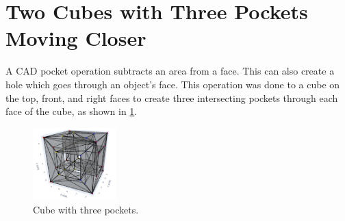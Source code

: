 \documentclass[ma]{uncgdissertationexp}
\theoremstyle{plain}
\theoremstyle{definition}
\theoremstyle{remark}
\begin{document}
\section{Two Cubes with Three Pockets Moving Closer}
\begin{multicols}{2}
A CAD pocket operation subtracts an area from a face. This can also create a hole which goes through an object's face. This operation was done to a cube on the top, front, and right faces to create three intersecting pockets through each face of the cube, as shown in \ref{fig:three_pocket_example}.
\columnbreak
\begin{figure}[H]
\begin{center}
	\includegraphics[height=1.1in]{one cube three pockets each.png}
    \caption{Cube with three pockets.}
\label{fig:three_pocket_example}
\end{center}
\end{figure}
\end{multicols}
\vspace{-7.5mm}
\end{document}
